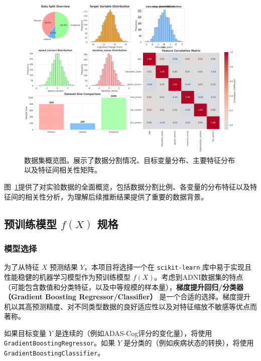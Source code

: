 \documentclass[12pt,a4paper]{article}
\begin{document}
\begin{figure}[H]
    \centering
    \includegraphics[width=1.0\textwidth]{data_overview.png}
    \caption{数据集概览图。展示了数据分割情况、目标变量分布、主要特征分布以及特征间相关性矩阵。}
    \label{fig:data_overview}
\end{figure}

图~\ref{fig:data_overview}提供了对实验数据的全面概览，包括数据分割比例、各变量的分布特征以及特征间的相关性分析，为理解后续推断结果提供了重要的数据背景。

\subsection{预训练模型 $f(X)$ 规格}
\label{sec:model_fx_spec}

\subsubsection{模型选择}
\label{sec:model_selection_fx}
为了从特征 $X$ 预测结果 $Y$，本项目将选择一个在 \texttt{scikit-learn} 库中易于实现且性能稳健的机器学习模型作为预训练模型 $f(X)$。考虑到ADNI数据集的特点（可能包含数值和分类特征，以及中等规模的样本量），\textbf{梯度提升回归/分类器（Gradient Boosting Regressor/Classifier）} 是一个合适的选择。梯度提升机以其高预测精度、对不同类型数据的良好适应性以及对特征缩放不敏感等优点而著称。

如果目标变量 $Y$ 是连续的（例如ADAS-Cog评分的变化量），将使用 \texttt{GradientBoostingRegressor}。如果 $Y$ 是分类的（例如疾病状态的转换），将使用 \texttt{GradientBoostingClassifier}。
\end{document}
